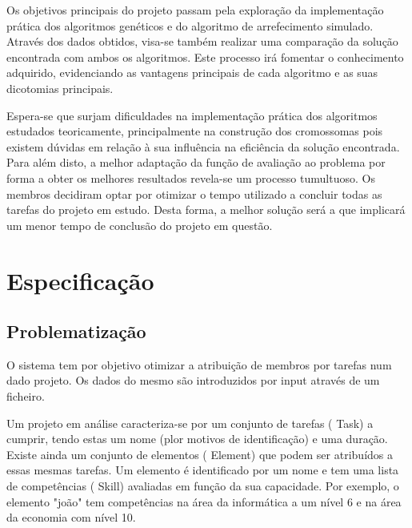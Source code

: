 \begin{titlepage}
Os objetivos principais do projeto passam pela exploração da implementação prática dos algoritmos genéticos e do algoritmo de arrefecimento simulado. Através dos dados obtidos, visa-se também realizar uma comparação da solução encontrada com ambos os algoritmos. Este processo irá fomentar o conhecimento adquirido, evidenciando as vantagens principais de cada algoritmo e as suas dicotomias principais.  

Espera-se que surjam dificuldades na implementação prática dos algoritmos estudados teoricamente, principalmente na construção dos cromossomas pois existem dúvidas em relação à sua influência na eficiência da solução encontrada. Para além disto, a melhor adaptação da função de avaliação ao problema por forma a obter os melhores resultados revela-se um processo tumultuoso. Os membros decidiram optar por otimizar o tempo utilizado a concluir todas as tarefas do projeto em estudo. Desta forma, a melhor solução será a que implicará um menor tempo de conclusão do projeto em questão.


\newpage %


\section{Especificação}

\subsection{Problematização}
\justify\normalsize
O sistema tem por objetivo otimizar a atribuição de membros por tarefas num dado projeto. Os dados do mesmo são introduzidos por input através de um ficheiro.

Um projeto em análise caracteriza-se por um conjunto de tarefas ( Task) a cumprir, tendo estas um nome (plor motivos de identificação) e uma duração. Existe ainda um conjunto de elementos ( Element) que podem ser atribuídos a essas mesmas tarefas. Um elemento é identificado por um nome e tem uma lista de competências ( Skill) avaliadas em função da sua capacidade. Por exemplo, o elemento "joão" tem competências na área da informática a um nível 6 e na área da economia com nível 10.


\end{titlepage}

